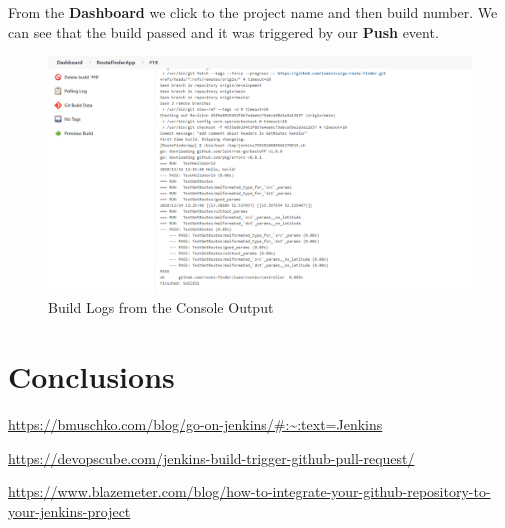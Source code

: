 \documentclass[12pt,a4paper,twoside]{article}
\begin{document}
From the \textbf{Dashboard} we click to the project name and then build number. We can see that the build passed and it was triggered by our \textbf{Push} event.

\begin{figure}[H]
    \centering
        \includegraphics[width=15cm]{images-aws/50-triggered-push-logs.png}
        \caption{Build Logs from the Console Output}
\end{figure}



\section{Conclusions}





\begin{thebibliography}{100}


	\bibitem{} \url{https://bmuschko.com/blog/go-on-jenkins/#:~:text=Jenkins}

	\bibitem{} \url{https://devopscube.com/jenkins-build-trigger-github-pull-request/}


	\bibitem{} \url{https://www.blazemeter.com/blog/how-to-integrate-your-github-repository-to-your-jenkins-project}



\end{thebibliography}
\end{document}
